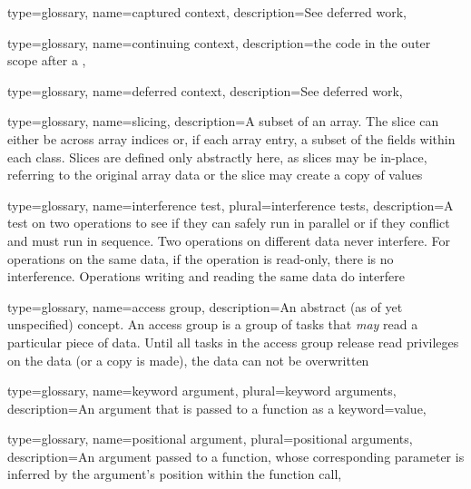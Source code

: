 {
  type=glossary,
  name={captured context},
  description={See \gls{deferred work}},
}

{
  type=glossary,
  name={continuing context},
  description={the code in the outer scope after a },
}

{
  type=glossary,
  name={deferred context},
  description={See \gls{deferred work}},
}

{
  type={glossary},
  name={slicing},
  description={A subset of an array. The slice can either be across array indices or, if each array entry, a subset of the fields within each class.  Slices are defined only abstractly here, as slices may be in-place, referring to the original array data
  or the slice may create a copy of values}
}

{
  type={glossary},
  name={interference test},
  plural={interference tests},
  description={A test on two operations to see if they can safely run in parallel or if they conflict and must run in sequence.
    Two operations on different data never interfere.
    For operations on the same data, if the operation is read-only, there is no interference.
    Operations writing and reading the same data do interfere}
}


{
  type={glossary},
  name={access group},
  description={An abstract (as of yet unspecified) concept. An access group is a group of tasks that \emph{may} read a particular piece of data. Until all tasks in the access group release read privileges on the data (or a copy is made),
  the data can not be overwritten}
}

{
  type={glossary},
  name={keyword argument},
  plural={keyword arguments},
  description={An argument that is passed to a function as a keyword=value},
}

{
  type={glossary},
  name={positional argument},
  plural={positional arguments},
  description={An argument passed to a function, whose corresponding parameter
    is inferred by the argument's position within the function call},
}

